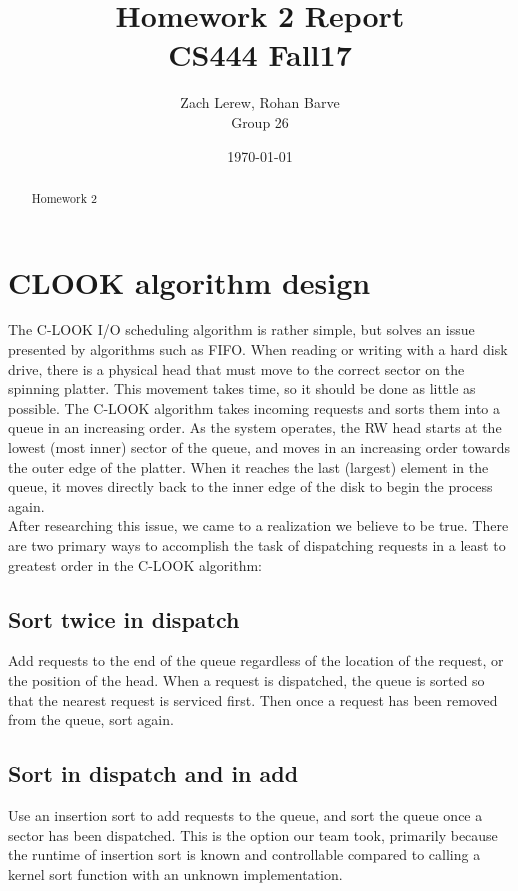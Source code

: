 \documentclass[letterpaper,10pt,fleqn]{article}
\title{Homework 2 Report\\\large CS444 Fall17}
\author{Zach Lerew, Rohan Barve\\\large Group 26}
\date{\today}
\begin{document}
	\begin{titlingpage}
		\maketitle
		\begin{abstract}
			\noindent Homework 2
		\end{abstract}
	\end{titlingpage}


	\section*{CLOOK algorithm design}
	The C-LOOK I/O scheduling algorithm is rather simple, but solves an issue presented by algorithms such as FIFO. When reading or writing with a hard disk drive, there is a physical head that must move to the correct sector on the spinning platter.
	This movement takes time, so it should be done as little as possible. The C-LOOK algorithm takes incoming requests and sorts them into a queue in an increasing order.
	As the system operates, the RW head starts at the lowest (most inner) sector of the queue, and moves in an increasing order towards the outer edge of the platter.
	When it reaches the last (largest) element in the queue, it moves directly back to the inner edge of the disk to begin the process again.
	\\After researching this issue, we came to a realization we believe to be true. There are two primary ways to accomplish the task of dispatching requests in a least to greatest order in the C-LOOK algorithm:
	\subsection{Sort twice in dispatch}
	Add requests to the end of the queue regardless of the location of the request, or the position of the head. When a request is dispatched, the queue is sorted so that the nearest request is serviced first. Then once a request has been removed from the queue, sort again.
	\subsection{Sort in dispatch and in add}
	Use an insertion sort to add requests to the queue, and sort the queue once a sector has been dispatched.
	This is the option our team took, primarily because the runtime of insertion sort is known and controllable compared to calling a kernel sort function with an unknown implementation.
\end{document}
